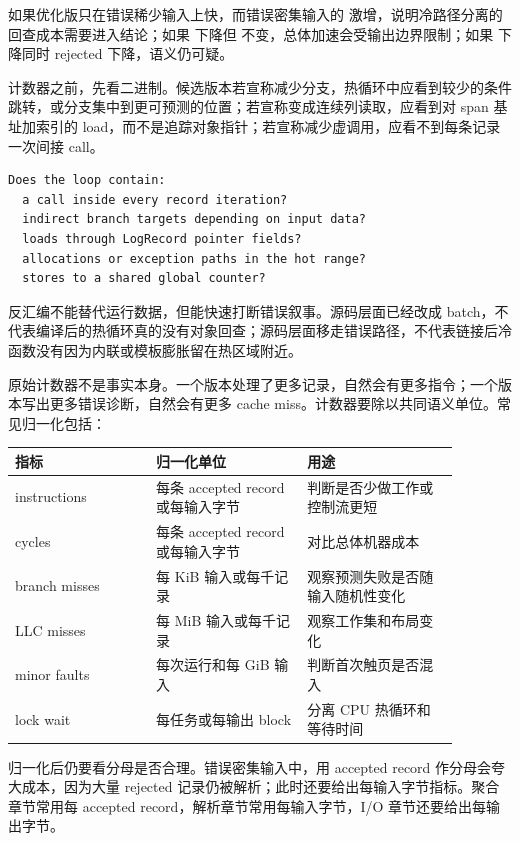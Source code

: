 如果优化版只在错误稀少输入上快，而错误密集输入的  激增，说明冷路径分离的回查成本需要进入结论；如果  下降但  不变，总体加速会受输出边界限制；如果  下降同时 rejected 下降，语义仍可疑。

计数器之前，先看二进制。候选版本若宣称减少分支，热循环中应看到较少的条件跳转，或分支集中到更可预测的位置；若宣称变成连续列读取，应看到对 span 基址加索引的 load，而不是追踪对象指针；若宣称减少虚调用，应看不到每条记录一次间接 call。

\begin{lstlisting}[numbers=none,caption={热循环反汇编审计问题}]
Does the loop contain:
  a call inside every record iteration?
  indirect branch targets depending on input data?
  loads through LogRecord pointer fields?
  allocations or exception paths in the hot range?
  stores to a shared global counter?
\end{lstlisting}

反汇编不能替代运行数据，但能快速打断错误叙事。源码层面已经改成 batch，不代表编译后的热循环真的没有对象回查；源码层面移走错误路径，不代表链接后冷函数没有因为内联或模板膨胀留在热区域附近。

原始计数器不是事实本身。一个版本处理了更多记录，自然会有更多指令；一个版本写出更多错误诊断，自然会有更多 cache miss。计数器要除以共同语义单位。常见归一化包括：

\begin{center}
\small
\begin{tabular}{@{}p{0.28\linewidth}p{0.30\linewidth}p{0.30\linewidth}@{}}
\toprule
指标 & 归一化单位 & 用途 \\
\midrule
instructions & 每条 accepted record 或每输入字节 & 判断是否少做工作或控制流更短 \\
cycles & 每条 accepted record 或每输入字节 & 对比总体机器成本 \\
branch misses & 每 KiB 输入或每千记录 & 观察预测失败是否随输入随机性变化 \\
LLC misses & 每 MiB 输入或每千记录 & 观察工作集和布局变化 \\
minor faults & 每次运行和每 GiB 输入 & 判断首次触页是否混入 \\
lock wait & 每任务或每输出 block & 分离 CPU 热循环和等待时间 \\
\bottomrule
\end{tabular}
\end{center}

归一化后仍要看分母是否合理。错误密集输入中，用 accepted record 作分母会夸大成本，因为大量 rejected 记录仍被解析；此时还要给出每输入字节指标。聚合章节常用每 accepted record，解析章节常用每输入字节，I/O 章节还要给出每输出字节。

